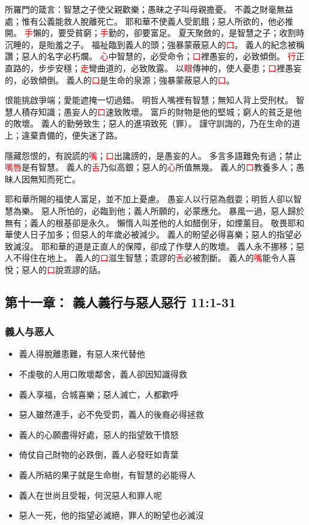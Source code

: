 所羅門的箴言：智慧之子使父親歡樂；愚昧之子叫母親擔憂。
不義之財毫無益處；惟有公義能救人脫離死亡。
耶和華不使義人受飢餓；惡人所欲的，他必推開。
\textcolor{red}{手}懶的，要受貧窮；\textcolor{red}{手}勤的，卻要富足。
夏天聚斂的，是智慧之子；收割時沉睡的，是貽羞之子。
福祉臨到義人的頭；強暴蒙蔽惡人的\textcolor{red}{口}。
義人的紀念被稱讚；惡人的名字必朽爛。
\textcolor{red}{心}中智慧的，必受命令；\textcolor{red}{口}裡愚妄的，必致傾倒。
\textcolor{red}{行}正直路的，步步安穩；\textcolor{red}{走}彎曲道的，必致敗露。
以\textcolor{red}{眼}傳神的，使人憂患；\textcolor{red}{口}裡愚妄的，必致傾倒。
義人的\textcolor{red}{口}是生命的泉源；強暴蒙蔽惡人的\textcolor{red}{口}。

恨能挑啟爭端；愛能遮掩一切過錯。
明哲人嘴裡有智慧；無知人背上受刑杖。
智慧人積存知識；愚妄人的\textcolor{red}{口}速致敗壞。
富戶的財物是他的堅城；窮人的貧乏是他的敗壞。
義人的勤勞致生；惡人的進項致死（罪）。
謹守訓誨的，乃在生命的道上；違棄責備的，便失迷了路。

隱藏怨恨的，有說謊的\textcolor{red}{嘴}；\textcolor{red}{口}出讒謗的，是愚妄的人。
多言多語難免有過；禁止\textcolor{red}{嘴唇}是有智慧。
義人的\textcolor{red}{舌}乃似高銀；惡人的\textcolor{red}{心}所值無幾。
義人的\textcolor{red}{口}教養多人；愚昧人因無知而死亡。

耶和華所賜的福使人富足，並不加上憂慮。
愚妄人以行惡為戲耍；明哲人卻以智慧為樂。
惡人所怕的，必臨到他；義人所願的，必蒙應允。
暴風一過，惡人歸於無有；義人的根基卻是永久。
懶惰人叫差他的人如醋倒牙，如煙薰目。
敬畏耶和華使人日子加多；但惡人的年歲必被減少。
義人的盼望必得喜樂；惡人的指望必致滅沒。
耶和華的道是正直人的保障，卻成了作孽人的敗壞。
義人永不挪移；惡人不得住在地上。
義人的\textcolor{red}{口}滋生智慧；乖謬的\textcolor{red}{舌}必被割斷。
義人的\textcolor{red}{嘴}能令人喜悅；惡人的\textcolor{red}{口}說乖謬的話。


\subsection{第十一章： 義人義行与惡人惡行  11:1-31}
\subsubsection{義人与恶人}
\begin{itemize}
\itemsep-.45em  
\item 義人得脫離患難，有惡人來代替他 
\item 不虔敬的人用口敗壞鄰舍，義人卻因知識得救
\item 義人享福，合城喜樂；惡人滅亡，人都歡呼
\item 惡人雖然連手，必不免受罰，義人的後裔必得拯救
\item 義人的心願盡得好處，惡人的指望致干憤怒
\item 倚仗自己財物的必跌倒，義人必發旺如青葉
\item 義人所結的果子就是生命樹，有智慧的必能得人
\item 義人在世尚且受報，何況惡人和罪人呢
\item 惡人一死，他的指望必滅絕，罪人的盼望也必滅沒
\end{itemize}
